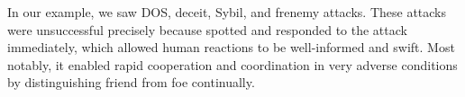 %
%
%

In our example, we saw DOS, deceit, Sybil, and frenemy attacks.
These attacks were unsuccessful precisely because \projectName spotted and responded to the attack immediately, which allowed human reactions to be well-informed and swift.
Most notably, it enabled rapid cooperation and coordination in very adverse conditions by distinguishing friend from foe continually.
